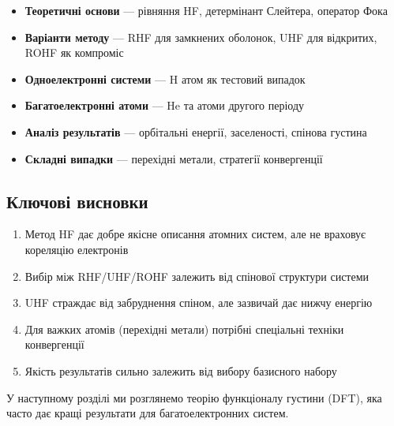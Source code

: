 \begin{itemize}
    \item \textbf{Теоретичні основи} --- рівняння HF, детермінант Слейтера, оператор Фока
    \item \textbf{Варіанти методу} --- RHF для замкнених оболонок, UHF для відкритих, ROHF як компроміс
    \item \textbf{Одноелектронні системи} --- H атом як тестовий випадок
    \item \textbf{Багатоелектронні атоми} --- He та атоми другого періоду
    \item \textbf{Аналіз результатів} --- орбітальні енергії, заселеності, спінова густина
    \item \textbf{Складні випадки} --- перехідні метали, стратегії конвергенції
\end{itemize}

\subsection{Ключові висновки}

\begin{enumerate}
    \item Метод HF дає добре якісне описання атомних систем, але не враховує кореляцію електронів
    \item Вибір між RHF/UHF/ROHF залежить від спінової структури системи
    \item UHF страждає від забруднення спіном, але зазвичай дає нижчу енергію
    \item Для важких атомів (перехідні метали) потрібні спеціальні техніки конвергенції
    \item Якість результатів сильно залежить від вибору базисного набору
\end{enumerate}

У наступному розділі ми розглянемо теорію функціоналу густини (DFT), яка часто дає кращі результати для багатоелектронних систем.
